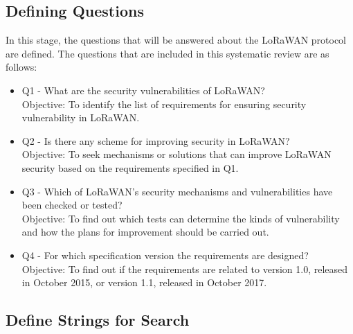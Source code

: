 \documentclass[manuscript,screen,review=false]{acmart}
\begin{document}
\subsection{Defining Questions}

In this stage, the questions that will be answered about the LoRaWAN protocol are defined. The questions that are included in this systematic review are as follows:
\begin{itemize}
\item Q1 - What are the security vulnerabilities of LoRaWAN? \\
Objective: To identify the list of requirements for ensuring security vulnerability in LoRaWAN.

\item Q2 - Is there any scheme for improving security in LoRaWAN? \\
Objective: To seek mechanisms or solutions that can improve LoRaWAN security based on the requirements specified in Q1.

\item Q3 - Which of LoRaWAN's security mechanisms and vulnerabilities have been checked or tested? \\
Objective: To find out which tests can determine the kinds of vulnerability and how the plans for improvement should be carried out.

\item Q4 - For which specification version the requirements are designed? \\
Objective: To find out if the requirements are related to version 1.0, released in October 2015, or version 1.1, released in October 2017. 
\end{itemize}

\subsection{Define Strings for Search}
\end{document}
